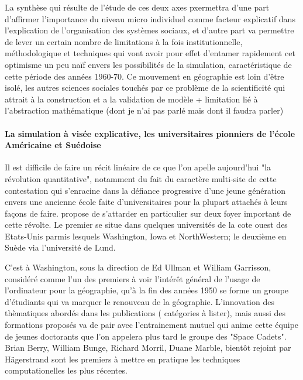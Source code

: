 {La synthèse qui résulte de l'étude de ces deux axes pxermettra d'une part d'affirmer l'importance du niveau micro individuel comme facteur explicatif dans l'explication de l'organisation des systèmes sociaux, et d'autre part va permettre de lever un certain nombre de limitations à la fois institutionnelle, méthodologique et techniques qui vont avoir pour effet d'entamer rapidement cet optimisme un peu naïf envers les possibilités de la simulation,  caractéristique de cette période des années 1960-70. Ce mouvement en géographie est loin d'être isolé, les autres sciences sociales touchés par ce problème de la scientificité qui attrait à la construction et a la validation de modèle + limitation lié à l'abstraction mathématique (dont je n'ai pas parlé mais dont il faudra parler) %

\paragraph{La simulation à visée explicative, les universitaires pionniers de l'école Américaine et Suédoise}



Il est difficile de faire un récit linéaire de ce que l'on apelle aujourd'hui "la révolution quantitative", notamment du fait du caractère multi-site de cette contestation qui s'enracine dans la défiance progressive d'une jeune génération envers une ancienne école faite d'universitaires pour la plupart attachés à leurs façons de faire. \autocite{Gould2004}  propose de s'attarder en particulier sur deux foyer important de cette révolte. Le premier se situe dans quelques universités de la cote ouest des Etats-Unis \autocite{Gould2004} parmis lesquels Washington, Iowa et NorthWestern; le deuxième en Suède via l'université de Lund.

C'est à Washington, sous la direction de Ed Ullman et William Garrisson, considéré comme l'un des premiers à voir l'intérêt général de l'usage de l'ordinateur pour la géographie, qu'à la fin des années 1950 se forme un groupe d'étudiants qui va marquer le renouveau de la géographie.  L'innovation des thèmatiques abordés dans les publications ( catégories à lister), mais aussi des formations proposés va de pair avec l'entrainement mutuel qui anime cette équipe de jeunes doctorants que l'on appelera plus tard le groupe des "Space Cadets". Brian Berry, William Bunge, Richard Morril, Duane Marble, bientôt rejoint par Hägerstrand sont les premiers à mettre en pratique les techniques computationelles les plus récentes. 

}

